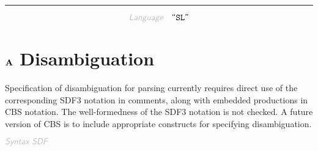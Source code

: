

\begin{center}
\rule{3in}{0.4pt}
\end{center}

\begin{displaymath}
\KEY{Language} \quad \STRING{SL}
\end{displaymath}

\section{$\SECT{A}$ Disambiguation}\hypertarget{secta-disambiguation}{}\label{secta-disambiguation}

Specification of disambiguation for parsing currently requires direct use of
  the corresponding SDF3 notation in comments, along with embedded productions
  in CBS notation. The well-formedness of the SDF3 notation is not checked.
  A future version of CBS is to include appropriate constructs for specifying
  disambiguation.

$\KEY{Syntax SDF}$

